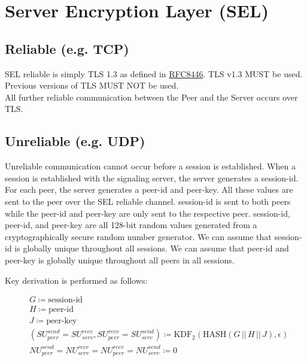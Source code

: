 \documentclass{article}
\begin{document}


    \section{Server Encryption Layer (SEL)}

    \subsection{Reliable (e.g. TCP)}

    SEL reliable is simply TLS 1.3 as defined in
    \href{https://datatracker.ietf.org/doc/html/rfc8446}{RFC8446}.
    TLS v1.3 MUST be used.
    Previous versions of TLS MUST NOT be used.\\


    All further reliable communication between the Peer and the Server occurs over TLS.

    \subsection{Unreliable (e.g. UDP)}

    Unreliable communication cannot occur before a session is established.
    When a session is established with the signaling server, the server generates a session-id.
    For each peer, the server generates a peer-id and peer-key.
    All these values are sent to the peer over the SEL reliable channel.
    session-id is sent to both peers while the peer-id and peer-key are only sent to the respective peer.
    session-id, peer-id, and peer-key are all 128-bit random values generated from a cryptographically secure random number generator.
    We can assume that session-id is globally unique throughout all sessions.
    We can assume that peer-id and peer-key is globally unique throughout all peers in all sessions.

    Key derivation is performed as follows:

    \begin{align*}
        &  G\coloneqq \text{session-id}                                                               \\
        &  H \coloneqq \text{peer-id}                                                                \\
        &  J \coloneqq \text{peer-key}                                                              \\
        &  (\mathit{SU}_{peer}^{send} = \mathit{SU}_{serv}^{recv}, \mathit{SU}_{peer}^{recv} = \mathit{SU}_{serv}^{send}) \coloneqq \text{KDF}_2(\text{HASH}(G\,
        ||\, H\,||\, J), \epsilon)                                        \\
        &   \mathit{NU}_{peer}^{send} = \mathit{NU}_{serv}^{recv} = \mathit{NU}_{peer}^{recv} = \mathit{NU}_{serv}^{send} \coloneqq 0
    \end{align*}
\end{document}
